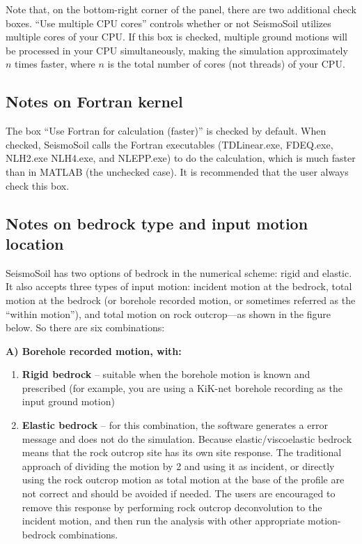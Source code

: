\documentclass[11pt,letterpaper]{article}
\begin{document}
Note that, on the bottom-right corner of the panel, there are two additional check boxes. ``Use multiple CPU cores'' controls whether or not SeismoSoil utilizes multiple cores of your CPU. If this box is checked, multiple ground motions will be processed in your CPU simultaneously, making the simulation approximately $n$ times faster, where $n$ is the total number of cores (not threads) of your CPU.

\subsection{Notes on Fortran kernel}

The box ``Use Fortran for calculation (faster)'' is checked by default. When checked, SeismoSoil calls the Fortran executables ({\textsf{TDLinear.exe}}, {\textsf{FDEQ.exe}}, {\textsf{NLH2.exe}}  {\textsf{NLH4.exe}}, and {\textsf{NLEPP.exe}}) to do the calculation, which is much faster than in MATLAB (the unchecked case). It is recommended that the user always check this box.

\newpage
\subsection{Notes on bedrock type and input motion location}\label{sec:bedrock-type-and-motion-location}

SeismoSoil has two options of bedrock in the numerical scheme: rigid and elastic. It also accepts three types of input motion: incident motion at the bedrock, total motion at the bedrock (or borehole recorded motion, or sometimes referred as the ``within motion''), and total motion on rock outcrop---as shown in the figure below. So there are six combinations:

\noindent\textbf{A)	Borehole recorded motion, with:}
\vspace{-10pt}
\begin{enumerate}
\item \textbf{Rigid bedrock} -- suitable when the borehole motion is known and prescribed (for example, you are using a KiK-net borehole recording as the input ground motion)
\item \textbf{Elastic bedrock} -- for this combination, the software generates a error message and does not do the simulation. Because elastic/viscoelastic bedrock means that the rock outcrop site has its own site response. The traditional approach of dividing the motion by 2 and using it as incident, or directly using the rock outcrop motion as total motion at the base of the profile are not correct and should be avoided if needed. The users are encouraged to remove this response by performing rock outcrop deconvolution to the incident motion, and then run the analysis with other appropriate motion-bedrock combinations.
\end{enumerate}
\end{document}
